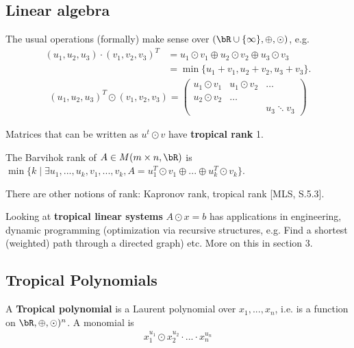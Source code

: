 \subsection{Linear algebra} The usual operations (formally) make sense over $(\bR\cup \{\infty\}, \oplus,\odot)$, e.g.
\begin{align*}
  (u_1,u_2,u_3)\cdot (v_1,v_2,v_3)^T &= u_1\odot v_1 \oplus u_2\odot v_2 \oplus u_3\odot v_3 \\
                                     &= \min\{u_1+v_1,u_2+v_2,u_3+v_3\}.
\end{align*}
\begin{align*}
  (u_1,u_2,u_3)^T\odot (v_1,v_2,v_3) = 
  \begin{pmatrix}
    u_1\odot v_1 & u_1 \odot v_2 & \hdots \\
    u_2\odot v_2 & \hdots & \\
                 & & u_3\ddots v_3
  \end{pmatrix}
\end{align*}
\begin{defn}\label{defn:tropical-rank}
  Matrices that can be written as $u^t \odot v$ have \textbf{tropical rank} 1.
\end{defn}
\begin{defn}\label{defn:barvihok-rank}
  The Barvihok rank of $A \in M(m\times n, \bR)$ is $\min\{k \mid \exists u_1,...,u_k, v_1,...,v_k, A = u_1^T\odot v_1\oplus...\oplus u_k^T\odot v_k\}$.
\end{defn}
There are other notions of rank: Kapronov rank, tropical rank [MLS, S.5.3].

Looking at \textbf{tropical linear systems} $A\odot x = b$ has applications in engineering, dynamic programming (optimization via recursive structures, e.g. Find a shortest (weighted) path through a directed graph) etc. More on this in section 3.

\subsection{Tropical Polynomials}
\begin{defn}\label{defn:tropical-polynomials}
  A \textbf{Tropical polynomial} is a Laurent polynomial over $x_1,...,x_n$, i.e. is a function on $\bR,\oplus,\odot)^n$. A monomial is 
  \begin{align*}
    x_1^{u_1}\odot x_2^{u_2} \cdot ... \cdot x_n^{u_n}
  \end{align*}
\end{defn}

